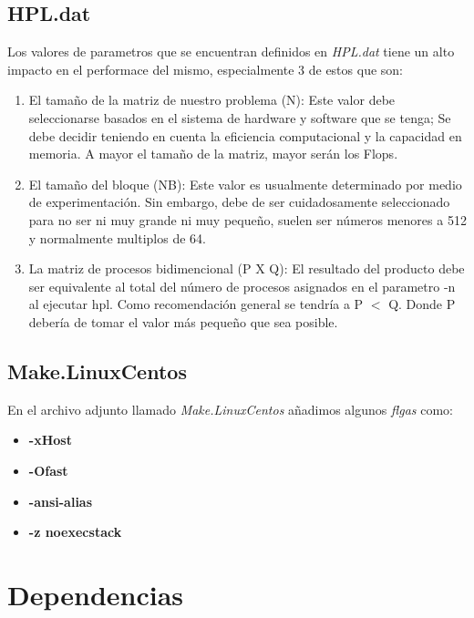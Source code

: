\documentclass[conference]{IEEEtran}
\begin{document}
\subsection{HPL.dat}
Los valores de parametros que se encuentran definidos en \textit{HPL.dat} tiene
un alto impacto en el performace del mismo, especialmente 3 de estos que son:

\begin{enumerate}
    \item El tamaño de la matriz de nuestro problema (N): Este valor debe seleccionarse basados
    en el sistema de hardware y software que se tenga; Se debe decidir teniendo en cuenta la 
    eficiencia computacional y la capacidad en memoria. A mayor el tamaño de la matriz, mayor 
    serán los Flops.
    
    \item El tamaño del bloque (NB): Este valor es usualmente determinado por medio de experimentación.
    Sin embargo, debe de ser cuidadosamente seleccionado para no ser ni muy grande ni muy pequeño, suelen 
    ser números menores a 512 y normalmente multiplos de 64.
    
    \item La matriz de procesos bidimencional (P X Q): El resultado del producto debe ser equivalente al total
    del número de procesos asignados en el parametro -n al ejecutar hpl. Como recomendación general se tendría
    a P \(<\) Q. Donde P debería de tomar el valor más pequeño que sea posible.
\end{enumerate}

\subsection{Make.Linux\textunderscore Centos}

En el archivo adjunto llamado \textit{Make.Linux\textunderscore Centos} añadimos algunos \textit{flgas} como:

\begin{itemize}
    \item \textbf{-xHost}
    \item \textbf{-Ofast}
    \item \textbf{-ansi-alias}
    \item \textbf{-z noexecstack}
\end{itemize}
    
\section{Dependencias}
\end{document}
